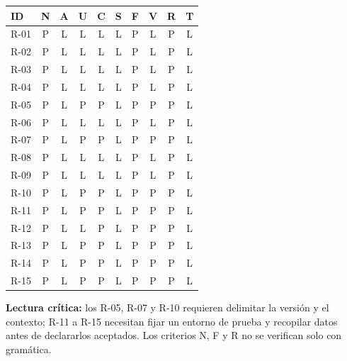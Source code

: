\begin{center}\scriptsize
\begin{tabular}{@{}lccccccccc@{}}\toprule
ID & N & A & U & C & S & F & V & R & T\\\midrule
R-01 & P & L & L & L & L & P & L & P & L\\
R-02 & P & L & L & L & L & P & L & P & L\\
R-03 & P & L & L & L & L & P & L & P & L\\
R-04 & P & L & L & L & L & P & L & P & L\\
R-05 & P & L & P & P & L & P & P & P & L\\
R-06 & P & L & L & L & L & P & L & P & L\\
R-07 & P & L & P & P & L & P & P & P & L\\
R-08 & P & L & L & L & L & P & L & P & L\\
R-09 & P & L & L & L & L & P & L & P & L\\
R-10 & P & L & P & P & L & P & P & P & L\\
R-11 & P & L & P & P & L & P & P & P & L\\
R-12 & P & L & L & P & L & P & P & P & L\\
R-13 & P & L & P & P & L & P & P & P & L\\
R-14 & P & L & P & P & L & P & P & P & L\\
R-15 & P & L & P & P & L & P & P & P & L\\\bottomrule
\end{tabular}\end{center}
\textbf{Lectura crítica:} los R-05, R-07 y R-10 requieren delimitar la versión y el contexto; R-11 a R-15 necesitan fijar un entorno de prueba y recopilar datos antes de declararlos aceptados. Los criterios N, F y R no se verifican solo con gramática.
